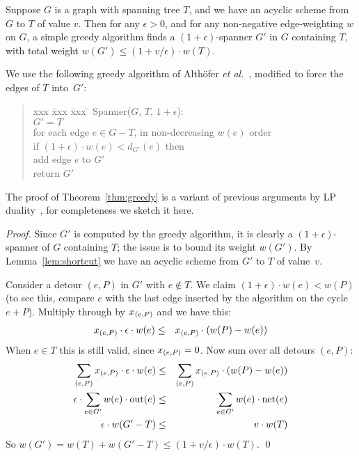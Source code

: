 \documentclass{llncs}
\begin{document}
\begin{theorem}
\label{thm:greedy}
Suppose $G$ is a graph with spanning tree $T$, and we have an acyclic
scheme from $G$ to $T$ of value $v$.  Then for any $\epsilon > 0$, and
for any non-negative edge-weighting $w$ on $G$, a simple greedy
algorithm finds a $(1+\epsilon)$-spanner $G'$ in $G$ containing $T$,
with total weight $w(G')\leq(1+v/\epsilon)\cdot w(T)$.
\end{theorem}
We use the following greedy algorithm of Alth\"{o}fer 
\emph{et al.}~\cite{Althofer:1993:SSW:156252.156258},
modified to force the edges of $T$ into~$G'$:
\begin{quote}
\begin{tabbing}
xxx \= xxx \= xxx \= \kill
Spanner($G$, $T$, $1+\epsilon$): \\
\> $G' = T$ \\
\> for each edge $e\in G-T$, in non-decreasing $w(e)$ order \\
\>\> if $(1+\epsilon)\cdot w(e) < d_{G'}(e)$ then \\
\>\>\> add edge $e$ to $G'$\\
\>return $G'$
\end{tabbing}
\end{quote}
The proof of Theorem~\ref{thm:greedy} is a variant of previous 
arguments by LP duality~\cite
{Grigni:2000:ATG:646253.686316,Grigni:2002:LSA:545381.545492},
for completeness we sketch it here.
\begin{proof}
Since $G'$ is computed by the greedy algorithm, it is clearly a
$(1+\epsilon)$-spanner of $G$ containing $T$; the issue is to bound
its weight $w(G')$.  
By Lemma~\ref{lem:shortcut} we have an acyclic scheme from $G'$ to
$T$ of value~$v$.  

Consider a detour $(e,P)$ in $G'$ with $e\not\in
T$. We claim $(1+\epsilon)\cdot w(e) < w(P)$ (to see this, compare $e$
with the last edge inserted by the algorithm on the cycle $e+P$). 
Multiply through by $x_{(e,P)}$ and we have this:
\begin{eqnarray*}
x_{(e,P)} \cdot \epsilon \cdot w(e) & \leq & x_{(e,P)} \cdot (w(P)-w(e))
\end{eqnarray*}
When $e\in T$ this is still valid, since $x_{(e,P)}=0$.  Now sum over all
detours $(e,P)$:
\begin{eqnarray*}
\sum_{(e,P)} x_{(e,P)} \cdot \epsilon \cdot w(e)
& \leq &
\sum_{(e,P)} x_{(e,P)} \cdot (w(P)-w(e)) \\
\epsilon \cdot \sum_{e\in G'} w(e)\cdot \mbox{out$(e)$}
& \leq &
\sum_{e\in G'} w(e) \cdot \mbox{net$(e)$} \\
\epsilon \cdot w(G'-T) & \leq & v \cdot w(T)
\end{eqnarray*}
So $w(G') = w(T)+ w(G'-T) \leq (1+v/\epsilon)\cdot w(T)$.
\qed
\end{proof}
\end{document}
